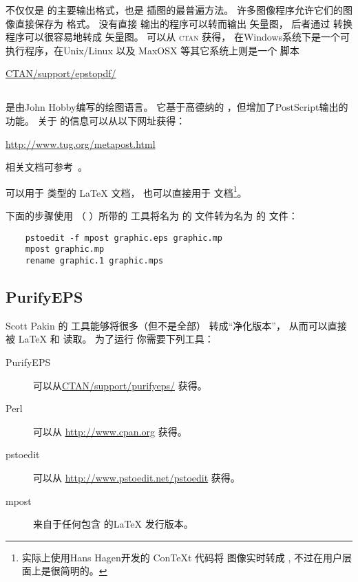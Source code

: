  不仅仅是 \pdfTeX{} 的主要输出格式，也是 \pdfTeX{} 插图的最普遍方法。
许多图像程序允许它们的图像直接保存为  格式。
没有直接  输出的程序可以转而输出  矢量图，
后者通过  转换程序可以很容易地转成  矢量图。
 可以从 \textsc{ctan} 获得，
在Windows系统下是一个可执行程序，在Unix/Linux 以及 MaxOSX 等其它系统上则是一个 脚本
\begin{center}
\href{ftp://ctan.tug.org/tex-archive/support/epstopdf/}{CTAN/support/epstopdf/}
\end{center}

\subsection{\MetaPost}\label{ssec:metapost}
\MetaPost{} 是由John Hobby编写的绘图语言。
它基于高德纳的 \MetaFont ，但增加了PostScript输出的功能。
关于 \MetaPost{} 的信息可以从以下网址获得：
\begin{center}
\url{http://www.tug.org/metapost.html}
\end{center}
相关文档可参考~\cite{metapost-doc}。

\MetaPost 可以用于  类型的 \LaTeX{} 文档，
也可以直接用于 \pdfLaTeX{} 文档\footnote{
	\pdfLaTeX{} 实际上使用Hans Hagen开发的 {Con\TeX t} 代码将 \MetaPost{} 图像实时转成 ,
	不过在用户层面上是很简明的。}。

下面的步骤使用 \MetaPost（  ）所带的  工具将名为  的  文件转为名为  的 \MetaPost{} 文件：

\begin{verbatim}
	pstoedit -f mpost graphic.eps graphic.mp
	mpost graphic.mp
	rename graphic.1 graphic.mps
\end{verbatim}

\subsection{PurifyEPS}\label{ssec:purifyeps}
Scott Pakin 的  工具能够将很多（但不是全部）  转成“净化版本”，
从而可以直接被 \LaTeX{} 和 \pdfLaTeX{} 读取。
为了运行  你需要下列工具：
\begin{description}
	\item[PurifyEPS] 可以从\href{ftp://ctan.tug.org/tex-archive/support/purifyeps/}{CTAN/support/purifyeps/} 获得。
	\item[Perl] 可以从 \url{http://www.cpan.org} 获得。
	\item[pstoedit] 可以从 \url{http://www.pstoedit.net/pstoedit} 获得。
	\item[mpost] 来自于任何包含 \MetaPost{} 的\LaTeX{} 发行版本。
\end{description}



